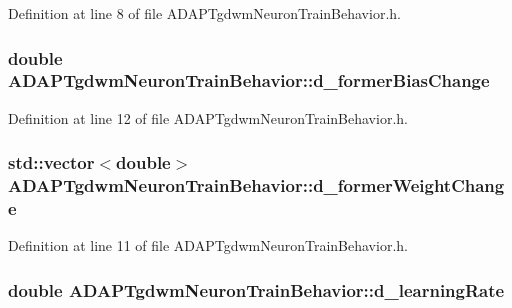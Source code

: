 Definition at line 8 of file ADAPTgdwmNeuronTrainBehavior.h.

\hypertarget{class_a_d_a_p_tgdwm_neuron_train_behavior_a30788883d9671facfea7b7d2ff16b5e7}{
\subsubsection[{d\_\-formerBiasChange}]{\setlength{\rightskip}{0pt plus 5cm}double {\bf ADAPTgdwmNeuronTrainBehavior::d\_\-formerBiasChange}}}
\label{class_a_d_a_p_tgdwm_neuron_train_behavior_a30788883d9671facfea7b7d2ff16b5e7}


Definition at line 12 of file ADAPTgdwmNeuronTrainBehavior.h.

\hypertarget{class_a_d_a_p_tgdwm_neuron_train_behavior_adcd67f1342ed2f85fa638215c5be4617}{
\subsubsection[{d\_\-formerWeightChange}]{\setlength{\rightskip}{0pt plus 5cm}std::vector$<$double$>$ {\bf ADAPTgdwmNeuronTrainBehavior::d\_\-formerWeightChange}}}
\label{class_a_d_a_p_tgdwm_neuron_train_behavior_adcd67f1342ed2f85fa638215c5be4617}


Definition at line 11 of file ADAPTgdwmNeuronTrainBehavior.h.

\hypertarget{class_a_d_a_p_tgdwm_neuron_train_behavior_a5864033f42a4683baad96e195fadab56}{
\subsubsection[{d\_\-learningRate}]{\setlength{\rightskip}{0pt plus 5cm}double {\bf ADAPTgdwmNeuronTrainBehavior::d\_\-learningRate}}}
\label{class_a_d_a_p_tgdwm_neuron_train_behavior_a5864033f42a4683baad96e195fadab56}


